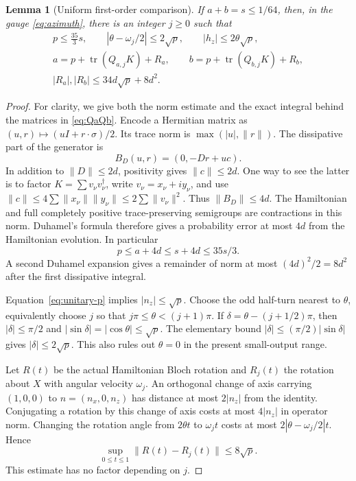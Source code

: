 \documentclass[11pt]{article}
\newtheorem{lemma}[theorem]{Lemma}
\theoremstyle{definition}
\theoremstyle{remark}
\DeclareMathOperator{\tr}{tr}
\begin{document}
\begin{lemma}[Uniform first-order comparison]\label{lem:uniform-swap}
If \(a+b=s\leq1/64\), then, in the gauge \eqref{eq:azimuth}, there is an integer \(j\geq0\) such that
\begin{gather}\label{eq:angle-comparison}
 p\leq\frac{35}{3}s,\qquad
 |\theta-\omega_j/2|\leq2\sqrt p,\qquad |h_z|\leq2\theta\sqrt p,\\
 \label{eq:uniform-first-order}
 a=p+\tr(Q_{a,j}K)+R_a,\qquad
 b=p+\tr(Q_{b,j}K)+R_b,\\
 \label{eq:uniform-error}
 |R_a|,|R_b|\leq34d\sqrt p+8d^2.
\end{gather}
\end{lemma}
\begin{proof}
For clarity, we give both the norm estimate and the exact integral behind the matrices in \eqref{eq:QaQb}. Encode a Hermitian matrix as \((u,r)\mapsto(uI+r\cdot\sigma)/2\). Its trace norm is \(\max(|u|,\|r\|)\). The dissipative part of the generator is
\[
 B_D(u,r)=(0,-Dr+uc).
\]
In addition to \(\|D\|\leq2d\), positivity gives \(\|c\|\leq2d\). One way to see the latter is to factor \(K=\sum v_\nu v_\nu^\dagger\), write \(v_\nu=x_\nu+iy_\nu\), and use
\(\|c\|\leq4\sum\|x_\nu\|\|y_\nu\|\leq2\sum\|v_\nu\|^2\).
Thus \(\|B_D\|\leq4d\). The Hamiltonian and full completely positive trace-preserving semigroups are contractions in this norm. Duhamel's formula therefore gives a probability error at most \(4d\) from the Hamiltonian evolution. In particular
\[
 p\leq a+4d\leq s+4d\leq35s/3.
\]
A second Duhamel expansion gives a remainder of norm at most \((4d)^2/2=8d^2\) after the first dissipative integral.

Equation~\eqref{eq:unitary-p} implies \(|n_z|\leq\sqrt p\). Choose the odd half-turn nearest to \(\theta\), equivalently choose \(j\) so that \(j\pi\leq\theta<(j+1)\pi\). If \(\delta=\theta-(j+1/2)\pi\), then \(|\delta|\leq\pi/2\) and \(|\sin\delta|=|\cos\theta|\leq\sqrt p\). The elementary bound \(|\delta|\leq(\pi/2)|\sin\delta|\) gives \(|\delta|\leq2\sqrt p\). This also rules out \(\theta=0\) in the present small-output range.

Let \(R(t)\) be the actual Hamiltonian Bloch rotation and \(R_j(t)\) the rotation about \(X\) with angular velocity \(\omega_j\). An orthogonal change of axis carrying \((1,0,0)\) to \(n=(n_x,0,n_z)\) has distance at most \(2|n_z|\) from the identity. Conjugating a rotation by this change of axis costs at most \(4|n_z|\) in operator norm. Changing the rotation angle from \(2\theta t\) to \(\omega_jt\) costs at most \(2|\theta-\omega_j/2|t\). Hence
\begin{equation}\label{eq:propagator-comparison}
 \sup_{0\leq t\leq1}\|R(t)-R_j(t)\|\leq8\sqrt p.
\end{equation}
This estimate has no factor depending on \(j\).


\end{proof}
\end{document}
